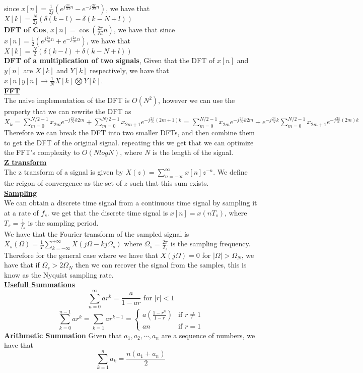 \documentclass[9pt]{article}
\begin{document}
since $x[n]=\frac{1}{2j}\left(e^{j\frac{2\pi}{Nl}n}-e^{-j\frac{2\pi}{Nl}n}\right)$, we have that
$X[k]=\frac{N}{2j}\left(\delta(k-l)-\delta(k-N+l)\right)$\\
\textbf{DFT of Cos}, $x[n]=\cos(\frac{2\pi}{Nl}n)$, we have that
since $x[n]=\frac{1}{2}\left(e^{j\frac{2\pi}{Nl}n}+e^{-j\frac{2\pi}{Nl}n}\right)$, we have that
$X[k]=\frac{N}{2}\left(\delta(k-l)+\delta(k-N+l)\right)$\\
\textbf{DFT of a multiplication of two signals}, Given that 
the DFT of $x[n]$ and $y[n]$ are $X[k]$ and $Y[k]$ respectively, we have that
$x[n]y[n]\to \frac{1}{N} X[k]\bigotimes Y[k]$.\\
\underline{\textbf{FFT}}\\
The naive implementation of the DFT is $O(N^2)$, however we can use the
property that we can rewrite the DFT as 
$X_k=\sum_{m=0}^{N/2-1}x_{2m}e^{-j\frac{2\pi}{N}k2m}+\sum_{m=0}^{N/2-1}x_{2m+1}e^{-j\frac{2\pi}{N}(2m+1)k}
=\sum_{m=0}^{N/2-1}x_{2m}e^{-j\frac{2\pi}{N}k2m}+e^{-j\frac{2\pi}{N}k}\sum_{m=0}^{N/2-1}x_{2m+1}e^{-j\frac{2\pi}{N}(2m)k}$
Therefore we can break the DFT into two smaller DFTs, and then combine them to get the DFT of the original signal.
repeating this we get that we can optimize the FFT's complexity to 
$O(NlogN)$, where $N$ is the length of the signal.\\
\underline{\textbf{Z transform}}\\
The z transform of a signal is given by $X(z)=\sum_{n=-\infty}^{\infty}x[n]z^{-n}$. We define the 
reigon of convergence as the set of $z$ such that this sum exists. \\
\underline{\textbf{Sampling}}\\
We can obtain a discrete time signal from a continuous time signal by sampling it at a rate of $f_s$.
we get that the discrete time signal is $x[n]=x(nT_s)$, where $T_s=\frac{1}{f_s}$ is the sampling period.\\
We have that the Fourier transform of the sampled signal is 
$X_{s}(\Omega)=\frac{1}{T}\sum_{k=-\infty}^{+\infty}X(j\Omega-kj\Omega_s)$
where $\Omega_s=\frac{2\pi}{T_s}$ is the sampling frequency.\\
Therefore for the general case where we have that 
$X(j\Omega)=0$ for $|\Omega|>\Omega_N$, we have that
if $\Omega_s>2\Omega_N$ then we 
can recover the signal from the samples, this is know as the Nyquist sampling rate. \\
\underline{\textbf{Usefull Summations}}\\
$$\sum_{n=0}^{\infty}ar^k=\frac{a}{1-ar} \text{ for }|r|<1$$
$$\sum_{k=0}^{n-1}ar^{k}=\sum_{k=1}ar^{k-1}=\begin{cases}
    a\left(\frac{1-r^n}{1-r}\right) & \text{if }r\neq 1\\
    an & \text{if }r=1
\end{cases}$$
\textbf{Arithmetic Summation}
Given that $a_1,a_2,\cdots,a_n$ are a sequence of numbers, we have that
$$\sum_{k=1}^n a_k=\frac{n(a_1+a_n)}{2}$$
\end{document}
